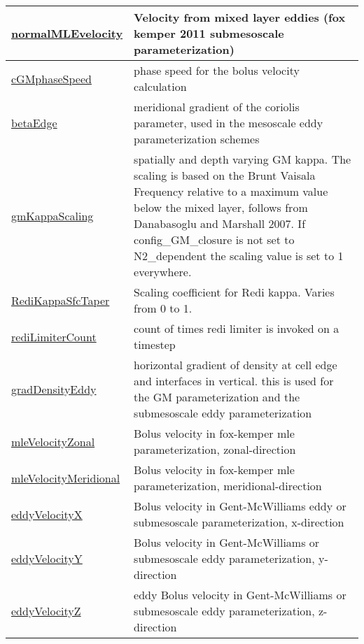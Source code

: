 {\begin{center}
\begin{longtable}{| p{2.0in} | p{4.0in} |}
    \hline
    \hyperref[subsec:var_sec_diagnostics_normalMLEvelocity]{normalMLEvelocity} & Velocity from mixed layer eddies (fox kemper 2011 submesoscale parameterization) \\
    \hline
    \hyperref[subsec:var_sec_diagnostics_cGMphaseSpeed]{cGMphaseSpeed} & phase speed for the bolus velocity calculation \\
    \hline
    \hyperref[subsec:var_sec_diagnostics_betaEdge]{betaEdge} & meridional gradient of the coriolis parameter, used in the mesoscale eddy parameterization schemes \\
    \hline
    \hyperref[subsec:var_sec_diagnostics_gmKappaScaling]{gmKappaScaling} & spatially and depth varying GM kappa.  The scaling is based on the Brunt Vaisala Frequency relative to a maximum value below the mixed layer, follows from Danabasoglu and Marshall 2007.  If config\_GM\_closure is not set to N2\_dependent the scaling value is set to 1 everywhere. \\
    \hline
    \hyperref[subsec:var_sec_diagnostics_RediKappaSfcTaper]{RediKappaSfcTaper} & Scaling coefficient for Redi kappa. Varies from 0 to 1. \\
    \hline
    \hyperref[subsec:var_sec_diagnostics_rediLimiterCount]{rediLimiterCount} & count of times redi limiter is invoked on a timestep \\
    \hline
    \hyperref[subsec:var_sec_diagnostics_gradDensityEddy]{gradDensityEddy} & horizontal gradient of density at cell edge and interfaces in vertical.  this is used for the GM parameterization and the submesoscale eddy parameterization \\
    \hline
    \hyperref[subsec:var_sec_diagnostics_mleVelocityZonal]{mleVelocityZonal} & Bolus velocity in fox-kemper mle parameterization, zonal-direction \\
    \hline
    \hyperref[subsec:var_sec_diagnostics_mleVelocityMeridional]{mleVelocityMeridional} & Bolus velocity in fox-kemper mle parameterization, meridional-direction \\
    \hline
    \hyperref[subsec:var_sec_diagnostics_eddyVelocityX]{eddyVelocityX} & Bolus velocity in Gent-McWilliams eddy or submesoscale parameterization, x-direction \\
    \hline
    \hyperref[subsec:var_sec_diagnostics_eddyVelocityY]{eddyVelocityY} & Bolus velocity in Gent-McWilliams or submesoscale eddy parameterization, y-direction \\
    \hline
    \hyperref[subsec:var_sec_diagnostics_eddyVelocityZ]{eddyVelocityZ} & eddy Bolus velocity in Gent-McWilliams or submesoscale eddy parameterization, z-direction \\

\end{longtable}
\end{center}}
